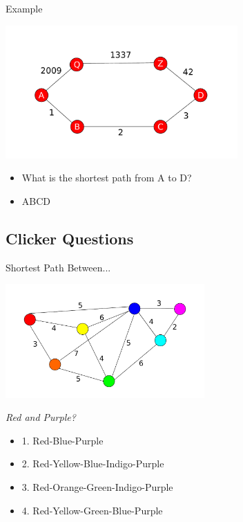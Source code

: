 \documentclass{beamer}
\begin{document}
\begin{frame}{Example}
	\centerline{\includegraphics[width=3.5in]{weighted_ex_1.pdf}}
	\begin{itemize}
	\item
		What is the shortest path from A to D?
	\item
		ABCD
	\end{itemize}
\end{frame}

\subsection{Clicker Questions}
\begin{frame}{Shortest Path Between...}
	\centerline{\includegraphics[width=3.0in]{weighted.pdf}}
	\textit{Red and Purple?}
        \begin{itemize}
	\item
		1. Red-Blue-Purple
	\item
		2. Red-Yellow-Blue-Indigo-Purple
	\item
		3. Red-Orange-Green-Indigo-Purple
	\item
		4. Red-Yellow-Green-Blue-Purple
	\end{itemize}
\end{frame}
\end{document}
